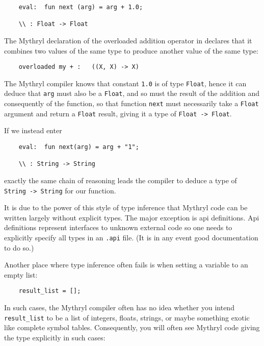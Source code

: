 \begin{verbatim}
    eval:  fun next (arg) = arg + 1.0;

    \\ : Float -> Float
\end{verbatim}

The Mythryl declaration of the overloaded addition operator in 
declares that it combines two values of the same type to produce another 
value of the same type:

\begin{verbatim}
    overloaded my + :   ((X, X) -> X)
\end{verbatim}

The Mythryl compiler knows that constant {\tt 1.0} is of type {\tt Float}, 
hence it can deduce that {\tt arg} must also be a {\tt Float}, and so 
must the result of the addition and consequently of the function, so 
that function {\tt next} must necessarily take a {\tt Float} argument 
and return a {\tt Float} result, giving it a type of {\tt Float -> Float}. 

If we instead enter

\begin{verbatim}
    eval:  fun next(arg) = arg + "1";

    \\ : String -> String
\end{verbatim}

exactly the same chain of reasoning leads the compiler to deduce a type 
of {\tt String -> String} for our function.

It is due to the power of this style of type inference that Mythryl code can 
be written largely without explicit types.  The major exception is api 
definitions.  Api definitions represent interfaces to unknown external code 
so one needs to explicitly specify all types in an {\tt .api} file. 
(It is in any event good documentation to do so.) 

Another place where type inference often fails is when setting a variable to 
an empty list:

\begin{verbatim}
    result_list = [];
\end{verbatim}

In such cases, the Mythryl compiler often has no idea whether you intend {\tt result\_list} 
to be a list of integers, floats, strings, or maybe something exotic like complete 
symbol tables.  Consequently, you will often see Mythryl code giving the type 
explicitly in such cases:


